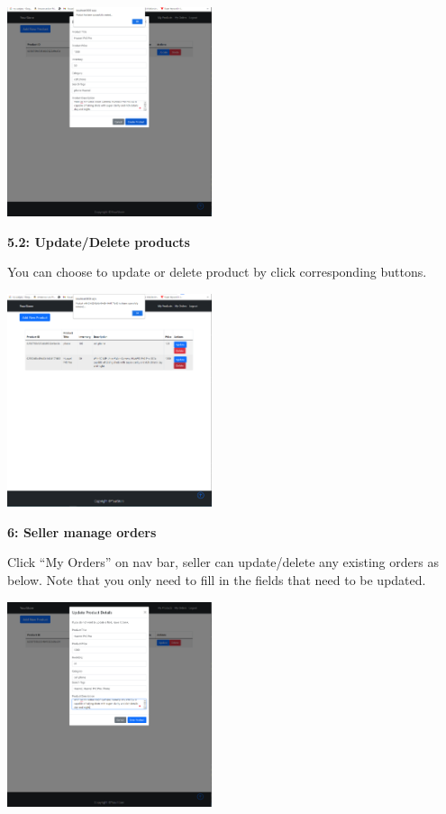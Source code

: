 \documentclass[12pt]{article}
\begin{document}
\includegraphics[width=0.45\textwidth]{UserGuideImage/9.png}

\vspace*{5mm}
\hspace*{5mm}\textbf{5.2: Update/Delete products}

You can choose to update or delete product by click corresponding buttons.

\includegraphics[width=0.45\textwidth]{UserGuideImage/10.png}

\newpage
\textbf{6: Seller manage orders}

Click “My Orders” on nav bar, seller can update/delete any existing orders as below.
Note that you only need to fill in the fields that need to be updated.

\includegraphics[width=0.45\textwidth]{UserGuideImage/11.png}
\end{document}
